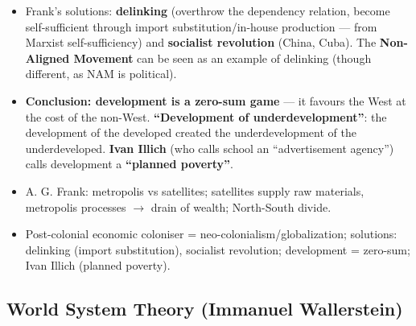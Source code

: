 \begin{KeyConcept}
\begin{itemize}
    \item Frank's solutions: \textbf{delinking} (overthrow the dependency relation, become self-sufficient through import substitution/in-house production --- from Marxist self-sufficiency) and \textbf{socialist revolution} (China, Cuba). The \textbf{Non-Aligned Movement} can be seen as an example of delinking (though different, as NAM is political).
    \item \textbf{Conclusion: development is a zero-sum game} --- it favours the West at the cost of the non-West. \textbf{``Development of underdevelopment''}: the development of the developed created the underdevelopment of the underdeveloped. \textbf{Ivan Illich} (who calls school an ``advertisement agency'') calls development a \textbf{``planned poverty''}.
\end{itemize}
\end{KeyConcept}

\begin{QuickRevision}
\begin{itemize}
    \item A. G. Frank: metropolis vs satellites; satellites supply raw materials, metropolis processes $\rightarrow$ drain of wealth; North-South divide.
    \item Post-colonial economic coloniser = neo-colonialism/globalization; solutions: delinking (import substitution), socialist revolution; development = zero-sum; Ivan Illich (planned poverty).
\end{itemize}
\end{QuickRevision}

\sectiondivider

\subsection{World System Theory (Immanuel Wallerstein)}

